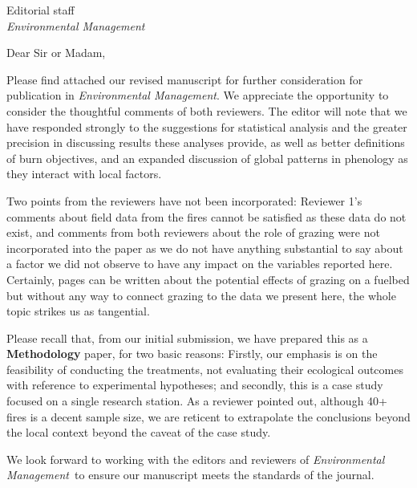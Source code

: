 \documentclass[parskip=half, 
			   fontsize=10pt,
			   paper=a4]				
{scrartcl}
\newcommand{\journal}{\emph{Environmental Management}}
\begin{document}
	\begin{letter}{Editorial staff\\
		\journal }
\setlength{\parindent}{12pt}

\opening{Dear Sir or Madam,}  
		
Please find attached our revised manuscript for further consideration for publication in \journal. 
We appreciate the opportunity to consider the thoughtful comments of both reviewers. 
The editor will note that we have responded strongly to the suggestions for statistical analysis and the greater precision in discussing results these analyses provide, as well as better definitions of burn objectives, and an expanded discussion of global patterns in phenology as they interact with local factors. 

Two points from the reviewers have not been incorporated: Reviewer 1's comments about field data from the fires cannot be satisfied as these data do not exist, and comments from both reviewers about the role of grazing were not incorporated into the paper as we do not have anything substantial to say about a factor we did not observe to have any impact on the variables reported here. 
Certainly, pages can be written about the potential effects of grazing on a fuelbed but without any way to connect grazing to the data we present here, the whole topic strikes us as tangential. 

Please recall that, from our initial submission, we have prepared this as a \textbf{Methodology} paper, for two basic reasons: Firstly, our emphasis is on the feasibility of conducting the treatments, not evaluating their ecological outcomes with reference to experimental hypotheses; and secondly, this is a case study focused on a single research station. 
As a reviewer pointed out, although 40+ fires is a decent sample size, we are reticent to extrapolate the conclusions beyond the local context beyond the caveat of the case study. 

We look forward to working with the editors and reviewers of \journal~to ensure our manuscript meets the standards of the journal. 

\vspace{-3em} 
\closing{} %
\end{letter}
\end{document}

